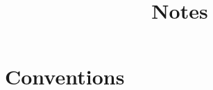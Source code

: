 \documentclass[12pt, a4paper]{article}
\title{Notes}
\begin{document}
\section{Conventions}
\end{document}
